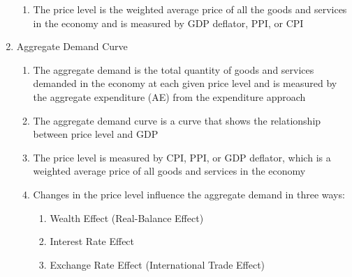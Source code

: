 \documentclass[12pt]{article}
\begin{document}
\begin{enumerate}
\begin{enumerate}
          \item The price level is the weighted average price of all the goods and services in the economy and is measured by GDP deflator, PPI, or CPI

        \end{enumerate}

      \item Aggregate Demand Curve

        \begin{enumerate}

          \item The aggregate demand is the total quantity of goods and services demanded in the economy at each given price level and is measured by the aggregate expenditure (AE) from the expenditure approach

          \item The aggregate demand curve is a curve that shows the relationship between price level and GDP

          \item The price level is measured by CPI, PPI, or GDP deflator, which is a weighted average price of all goods and services in the economy

          \item Changes in the price level influence the aggregate demand in three ways:

            \begin{enumerate}

              \item Wealth Effect (Real-Balance Effect)

              \item Interest Rate Effect

              \item Exchange Rate Effect (International Trade Effect)

            \end{enumerate}

        \end{enumerate}

    \end{enumerate}
\end{document}
